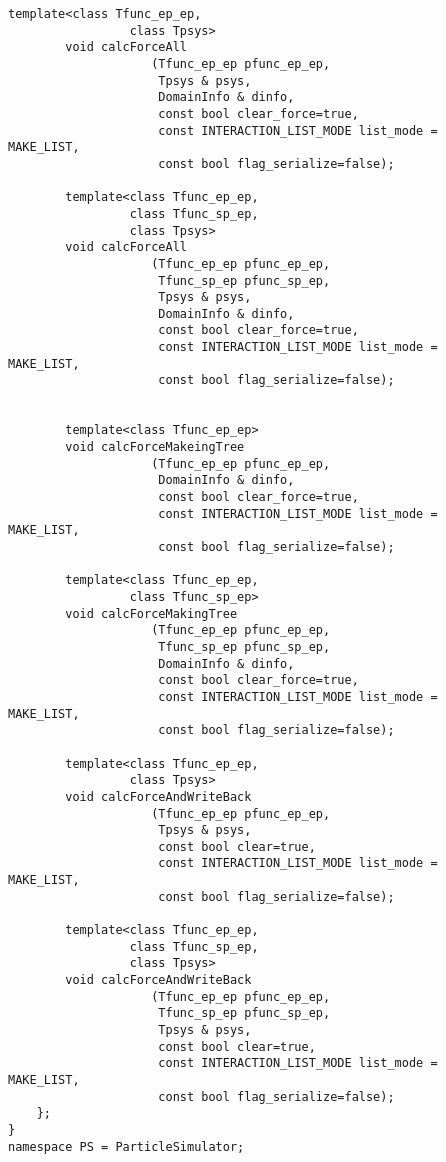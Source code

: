 \begin{lstlisting}[caption=TreeForForce1]
        template<class Tfunc_ep_ep,
                 class Tpsys>
        void calcForceAll
                    (Tfunc_ep_ep pfunc_ep_ep,
                     Tpsys & psys,
                     DomainInfo & dinfo,
                     const bool clear_force=true,
                     const INTERACTION_LIST_MODE list_mode = MAKE_LIST,
                     const bool flag_serialize=false);

        template<class Tfunc_ep_ep,
                 class Tfunc_sp_ep,
                 class Tpsys>
        void calcForceAll
                    (Tfunc_ep_ep pfunc_ep_ep,
                     Tfunc_sp_ep pfunc_sp_ep,
                     Tpsys & psys,
                     DomainInfo & dinfo,
                     const bool clear_force=true,
                     const INTERACTION_LIST_MODE list_mode = MAKE_LIST,
                     const bool flag_serialize=false);
                     

        template<class Tfunc_ep_ep>
        void calcForceMakeingTree
                    (Tfunc_ep_ep pfunc_ep_ep,
                     DomainInfo & dinfo,
                     const bool clear_force=true,
                     const INTERACTION_LIST_MODE list_mode = MAKE_LIST,
                     const bool flag_serialize=false);
                     
        template<class Tfunc_ep_ep,
                 class Tfunc_sp_ep>
        void calcForceMakingTree
                    (Tfunc_ep_ep pfunc_ep_ep,
                     Tfunc_sp_ep pfunc_sp_ep,
                     DomainInfo & dinfo,
                     const bool clear_force=true,
                     const INTERACTION_LIST_MODE list_mode = MAKE_LIST,
                     const bool flag_serialize=false);

        template<class Tfunc_ep_ep,
                 class Tpsys>
        void calcForceAndWriteBack
                    (Tfunc_ep_ep pfunc_ep_ep,
                     Tpsys & psys,
                     const bool clear=true,
                     const INTERACTION_LIST_MODE list_mode = MAKE_LIST,
                     const bool flag_serialize=false);
                     
        template<class Tfunc_ep_ep,
                 class Tfunc_sp_ep,
                 class Tpsys>
        void calcForceAndWriteBack
                    (Tfunc_ep_ep pfunc_ep_ep,
                     Tfunc_sp_ep pfunc_sp_ep,
                     Tpsys & psys,
                     const bool clear=true,
                     const INTERACTION_LIST_MODE list_mode = MAKE_LIST,
                     const bool flag_serialize=false);
    };
}
namespace PS = ParticleSimulator;
\end{lstlisting}


